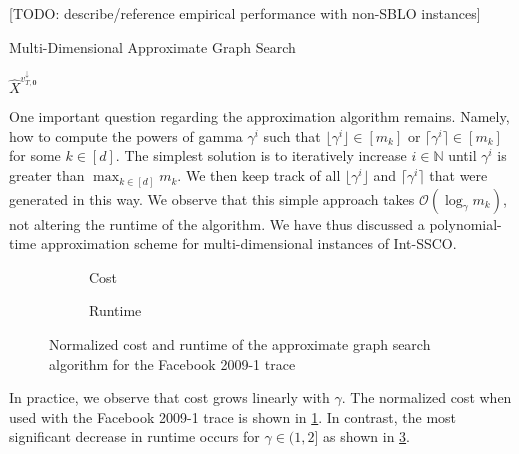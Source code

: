 [TODO: describe/reference empirical performance with non-SBLO instances]

\begin{algorithm}
    \caption{Multi-Dimensional Approximate Graph Search~\cite{Albers2021_2}}\label{alg:md:approximate_graph_search}
    \Return $\hat{X}^{v_{T,\mathbf{0}}^{\downarrow}}$\;
\end{algorithm}

One important question regarding the approximation algorithm remains. Namely, how to compute the powers of gamma $\gamma^i$ such that $\lfloor\gamma^i\rfloor \in [m_k]$ or $\lceil\gamma^i\rceil \in [m_k]$ for some $k \in [d]$. The simplest solution is to iteratively increase $i \in \mathbb{N}$ until $\gamma^i$ is greater than $\max_{k \in [d]} m_k$. We then keep track of all $\lfloor\gamma^i\rfloor$ and $\lceil\gamma^i\rceil$ that were generated in this way. We observe that this simple approach takes $\mathcal{O}(\log_{\gamma} m_k)$, not altering the runtime of the algorithm. We have thus discussed a polynomial-time approximation scheme for multi-dimensional instances of Int-SSCO.

\begin{figure}
    \begin{subfigure}[b]{.5\linewidth}
    \resizebox{\textwidth}{!}{}
    \caption{Cost}\label{fig:approx_graph_search:cost}
    \end{subfigure}
    \begin{subfigure}[b]{.5\linewidth}
    \resizebox{\textwidth}{!}{}
    \caption{Runtime}\label{fig:approx_graph_search:runtime}
    \end{subfigure}
    \caption{Normalized cost and runtime of the approximate graph search algorithm for the Facebook 2009-1 trace}
\end{figure}

In practice, we observe that cost grows linearly with $\gamma$. The normalized cost when used with the Facebook 2009-1 trace is shown in \cref{fig:approx_graph_search:cost}. In contrast, the most significant decrease in runtime occurs for $\gamma \in (1, 2]$ as shown in \cref{fig:approx_graph_search:runtime}.
